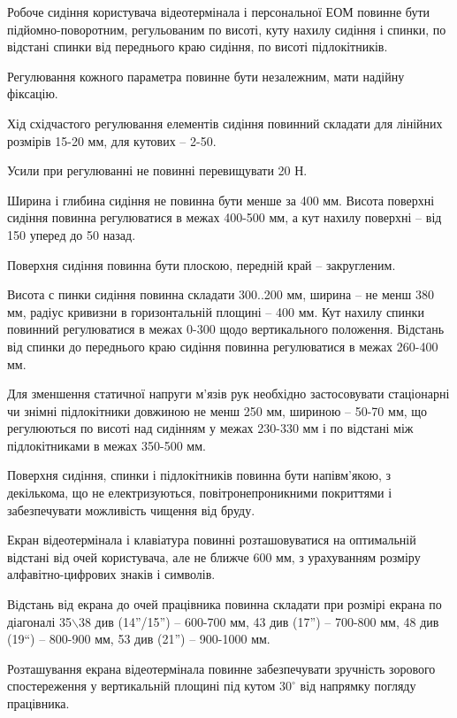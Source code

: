 \documentclass[simple,a4paper,14pt,ukrainian,utf8]{eskdtext}
\begin{document}
\begin{appendices}
                Робоче сидіння користувача відеотермінала і персональної ЕОМ повинне бути підйомно-поворотним, регульованим по висоті, куту нахилу сидіння і спинки, по відстані спинки від переднього краю сидіння, по висоті підлокітників.

                Регулювання кожного параметра повинне бути незалежним, мати надійну фіксацію.

                Хід східчастого регулювання елементів сидіння повинний складати для лінійних розмірів 15-20 мм, для кутових -- 2-50.

                Усили при регулюванні не повинні перевищувати 20 Н.

                Ширина і глибина сидіння не повинна бути менше за 400 мм. Висота поверхні сидіння повинна регулюватися в межах 400-500 мм, а кут нахилу поверхні -- від 150 уперед до 50 назад.

                Поверхня сидіння повинна бути плоскою, передній край -- закругленим.

                Висота с пинки сидіння повинна складати 300..200 мм, ширина -- не менш 380 мм, радіус кривизни в горизонтальній площині -- 400 мм. Кут нахилу спинки повинний регулюватися в межах 0-300 щодо вертикального положення. Відстань від спинки до переднього краю сидіння повинна регулюватися в межах 260-400 мм.

                Для зменшення статичної напруги м'язів рук необхідно застосовувати стаціонарні чи знімні підлокітники довжиною не менш 250 мм, шириною -- 50-70 мм, що регулюються по висоті над сидінням у межах 230-330 мм і по відстані між підлокітниками в межах 350-500 мм.

                Поверхня сидіння, спинки і підлокітників повинна бути напівм'якою, з декількома, що не електризуються, повітронепроникними покриттями і забезпечувати можливість чищення від бруду.

                Екран відеотермінала і клавіатура повинні розташовуватися на оптимальній відстані від очей користувача, але не ближче 600 мм, з урахуванням розміру алфавітно-цифрових знаків і символів.

                Відстань від екрана до очей працівника повинна складати при розмірі екрана по діагоналі 35\ensuremath{\backslash}38 див (14''/15'') -- 600-700 мм, 43 див (17'') -- 700-800 мм, 48 див (19{``}) -- 800-900 мм, 53 див (21'') -- 900-1000 мм.

                Розташування екрана відеотермінала повинне забезпечувати зручність зорового спостереження у вертикальній площині під кутом $30^{\circ}$ від напрямку погляду працівника.


\end{appendices}
\end{document}
